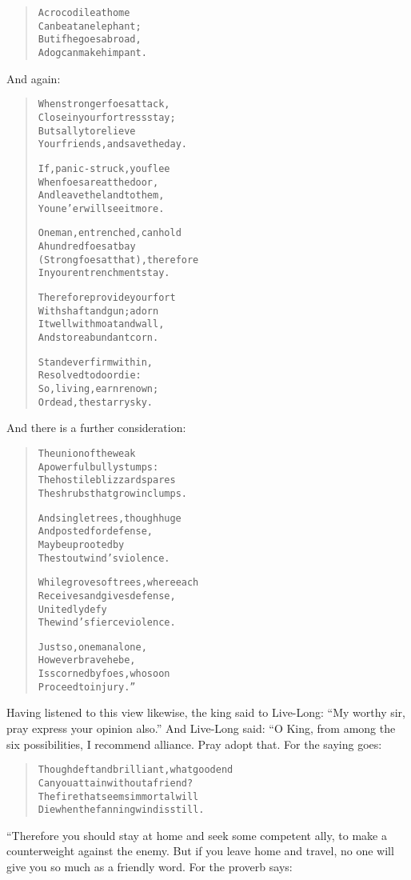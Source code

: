 \documentclass[article, twoside, 14pt]{memoir}
\renewenvironment{verbatim}{%
\begin{quote}%
\vskip -10pt%
\begin{alltt}\normalfont\large}{\end{alltt}%
\end{quote}%
\vskip -10pt
} %
\begin{document}
\begin{verbatim}
A crocodile at home
    Can beat an elephant;
But if he goes abroad,
    A dog can make him pant.
\end{verbatim}
And again:

\begin{verbatim}
When stronger foes attack,
    Close in your fortress stay;
But sally to relieve
    Your friends, and save the day.

If, panic-struck, you flee
    When foes are at the door,
And leave the land to them,
    You ne'er will see it more.

One man, entrenched, can hold
    A hundred foes at bay
(Strong foes at that), therefore
    In your entrenchment stay.

Therefore provide your fort
    With shaft and gun; adorn
It well with moat and wall,
    And store abundant corn.

Stand ever firm within,
    Resolved to do or die:
So, living, earn renown;
    Or dead, the starry sky.
\end{verbatim}
And there is a further consideration:

\begin{verbatim}
The union of the weak
    A powerful bully stumps:
The hostile blizzard spares
    The shrubs that grow in clumps.

And single trees, though huge
    And posted for defense,
May be uprooted by
    The stout wind's violence.

While groves of trees, where each
    Receives and gives defense,
Unitedly defy
    The wind's fierce violence.

Just so, one man alone,
    However brave he be,
Is scorned by foes, who soon
    Proceed to injury.”
\end{verbatim}
Having listened to this view likewise, the king said to Live-Long:
``My worthy sir, pray express your opinion also.'' And Live-Long
said: “O King, from among the six possibilities, I recommend
alliance. Pray adopt that. For the saying goes:

\begin{verbatim}
Though deft and brilliant, what good end
Can you attain without a friend?
The fire that seems immortal will
Die when the fanning wind is still.
\end{verbatim}
“Therefore you should stay at home and seek some competent ally, to
make a counterweight against the enemy. But if you leave home and
travel, no one will give you so much as a friendly word. For the
proverb says:
\end{document}
